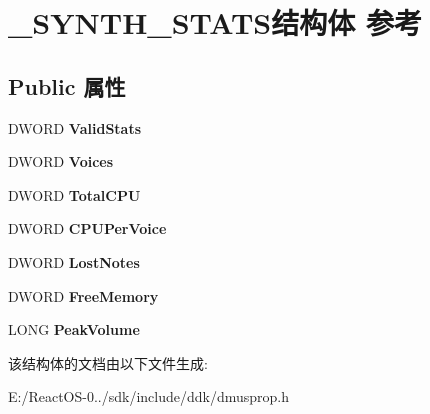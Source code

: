 \hypertarget{struct___s_y_n_t_h___s_t_a_t_s}{}\section{\+\_\+\+S\+Y\+N\+T\+H\+\_\+\+S\+T\+A\+T\+S结构体 参考}
\label{struct___s_y_n_t_h___s_t_a_t_s}
\subsection*{Public 属性}
\begin{DoxyCompactItemize}
\item 
\mbox{\label{struct___s_y_n_t_h___s_t_a_t_s_ae4ef5d5b075808696641c1b542742868}} 
D\+W\+O\+RD {\bfseries Valid\+Stats}
\item 
\mbox{\label{struct___s_y_n_t_h___s_t_a_t_s_a4e61c0cf0cdc56ecda31fdccfda6b873}} 
D\+W\+O\+RD {\bfseries Voices}
\item 
\mbox{\label{struct___s_y_n_t_h___s_t_a_t_s_a539527ae737e6c7c9284ca2f869889c9}} 
D\+W\+O\+RD {\bfseries Total\+C\+PU}
\item 
\mbox{\label{struct___s_y_n_t_h___s_t_a_t_s_a83d70044dce67a7496a5cfb0b0e8407c}} 
D\+W\+O\+RD {\bfseries C\+P\+U\+Per\+Voice}
\item 
\mbox{\label{struct___s_y_n_t_h___s_t_a_t_s_a550a144eab6c162b1dfb51cc53f373b6}} 
D\+W\+O\+RD {\bfseries Lost\+Notes}
\item 
\mbox{\label{struct___s_y_n_t_h___s_t_a_t_s_a7b13aad8997f2e2e347112bee84e4a47}} 
D\+W\+O\+RD {\bfseries Free\+Memory}
\item 
\mbox{\label{struct___s_y_n_t_h___s_t_a_t_s_ab5c137f0a6bfa7debb97aa657f54926d}} 
L\+O\+NG {\bfseries Peak\+Volume}
\end{DoxyCompactItemize}


该结构体的文档由以下文件生成\+:\begin{DoxyCompactItemize}
\item 
E\+:/\+React\+O\+S-\/0../sdk/include/ddk/dmusprop.\+h\end{DoxyCompactItemize}
